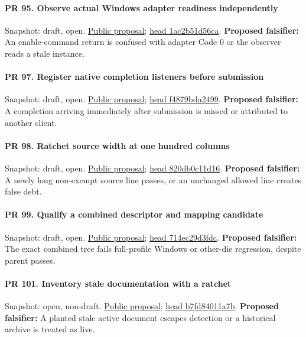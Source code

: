 \paragraph{PR 95. Observe actual Windows adapter readiness independently}
\readcode Snapshot: draft, open.
\href{\repobase/pull/95}{Public proposal};
\href{\repobase/commit/1ac2b51d56ca5fc20bcc08b30c496e20d920635b}{head 1ac2b51d56ca}.
\textbf{Proposed falsifier:} An enable-command return is confused with adapter Code 0 or the
  observer reads a stale instance.

\paragraph{PR 97. Register native completion listeners before submission}
\readcode Snapshot: draft, open.
\href{\repobase/pull/97}{Public proposal};
\href{\repobase/commit/f4879bda249946da0ce237edd84cfce442ed6480}{head f4879bda2499}.
\textbf{Proposed falsifier:} A completion arriving immediately after submission is missed or
  attributed to another client.

\paragraph{PR 98. Ratchet source width at one hundred columns}
\readcode Snapshot: draft, open.
\href{\repobase/pull/98}{Public proposal};
\href{\repobase/commit/820db0c11d16e150d256a522495f895e1da1bba6}{head 820db0c11d16}.
\textbf{Proposed falsifier:} A newly long non-exempt source line passes, or an unchanged allowed
  line creates false debt.

\paragraph{PR 99. Qualify a combined descriptor and mapping candidate}
\readcode Snapshot: draft, open.
\href{\repobase/pull/99}{Public proposal};
\href{\repobase/commit/714ec29d3fdca0a013d9d478755346b0f1af6fa7}{head 714ec29d3fdc}.
\textbf{Proposed falsifier:} The exact combined tree fails full-profile Windows or other-die
  regression, despite parent passes.

\paragraph{PR 101. Inventory stale documentation with a ratchet}
\readcode Snapshot: open, non-draft.
\href{\repobase/pull/101}{Public proposal};
\href{\repobase/commit/b7fd84011a7b2b10cd12a6de7456b432a8bbd2b2}{head b7fd84011a7b}.
\textbf{Proposed falsifier:} A planted stale active document escapes detection or a historical
  archive is treated as live.

